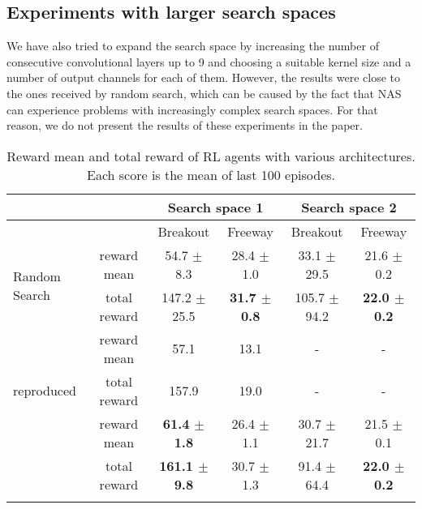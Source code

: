 \documentclass{svproc}
\begin{document}
\subsection{Experiments with larger search spaces}
We have also tried to expand the search space by increasing the number of consecutive convolutional layers up to 9 and choosing a suitable kernel size and a number of output channels for each of them. However, the results were close to the ones received by random search, which can be caused by the fact that NAS can experience problems with increasingly complex search spaces. For that reason, we do not present the results of these experiments in the paper. 



\begin{table}[t]
\centering 
 \caption{Reward mean and total reward of RL agents with various architectures. Each score is the mean of last 100 episodes.}
 \label{tbl:results_table}
\begin{tabularx}{\textwidth}{@{}lccccc@{}}
\toprule

            & & \multicolumn{2}{c}{Search space 1}  &  \multicolumn{2}{c}{Search space 2} \\ 
\midrule

            & & Breakout & Freeway & Breakout & Freeway \\ 
\midrule


\multirow{2}{*}{Random Search}      & reward mean     & 54.7 $\pm$ 8.3    & 28.4 $\pm$ 1.0  & 33.1 $\pm$ 29.5   & 21.6 $\pm$ 0.2  \\ 
                                    & total reward    & 147.2 $\pm$ 25.5  & \textbf{31.7 $\pm$ 0.8}  & 105.7 $\pm$ 94.2    & \textbf{22.0 $\pm$ 0.2}  \\ 
\addlinespace

 \multirow{1}{*}{Nature-CNN \cite{Humanlevel2015},} & reward mean               & 57.1          & 13.1      & -         & -     \\ 
 \quad reproduced                                   & total reward              & 157.9         & 19.0      & -         & -     \\ 


\addlinespace

\multirow{2}{*}{ENAS}   & reward mean             & \textbf{61.4 $\pm$ 1.8}          & 26.4 $\pm$ 1.1  & 30.7 $\pm$ 21.7      & 21.5 $\pm$ 0.1                     \\
                        & total reward             & \textbf{161.1 $\pm$ 9.8}    & 30.7 $\pm$ 1.3    & 91.4  $\pm$ 64.4   & \textbf{22.0 $\pm$ 0.2}                     \\ 
\addlinespace


\end{tabularx}
\end{table}
\end{document}
